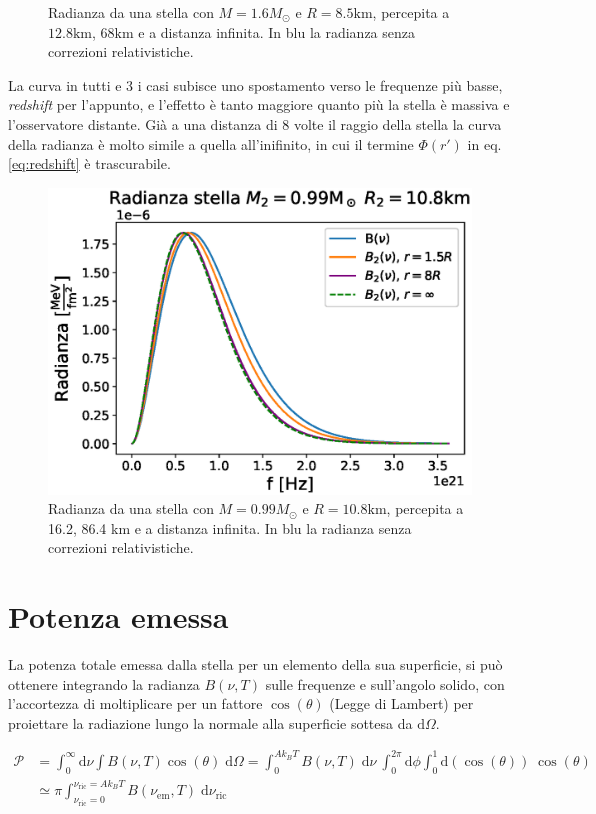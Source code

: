 \documentclass[a4paper, titlepage]{article}
\begin{document}
\begin{figure}[h]
\begin{minipage}{0.49\textwidth}
        \caption{Radianza da una stella con $M = 1.6M_\odot$ e
        $R = 8.5\unit{\kilo\meter}$, percepita a $12.8 \unit{\kilo\meter}$,
        $68 \unit{\kilo\meter}$ e a distanza infinita.
        In blu la radianza senza correzioni relativistiche.\\}
        \label{fig:rad2}
    \end{minipage}
\end{figure}

La curva in tutti e 3 i casi subisce uno spostamento verso le frequenze più
basse, \textit{redshift} per l'appunto, e l'effetto è tanto maggiore quanto più
la stella è massiva e l'osservatore distante. Già a una distanza di 8 volte il
raggio della stella la curva della radianza è molto simile a quella
all'inifinito, in cui il termine $\Phi (r')$ in eq. \ref{eq:redshift} è
trascurabile.
\begin{figure}[h]
    \centering
    \includegraphics[width = 0.6 \textwidth]{Figures/radianza2.eps}
    \caption{Radianza da una stella con $M = 0.99M_\odot$ e
    $R = 10.8\unit{\kilo\meter}$, percepita a 16.2, 86.4 \unit{\kilo\meter} e a
    distanza infinita.
    In blu la radianza senza correzioni relativistiche.}
    \label{fig:rad3}
\end{figure}

\newpage


\section{Potenza emessa}
La potenza totale emessa dalla stella per un elemento della sua superficie, si
può ottenere integrando la radianza $B(\nu, T)$ sulle frequenze e sull'angolo
solido, con l'accortezza di moltiplicare per un fattore $\cos(\theta)$ (Legge
di Lambert) per proiettare la radiazione lungo la normale alla superficie
sottesa da $\mathrm{d}\Omega$.

\begin{align}
    \mathcal P &= \int_0^\infty \mathrm{d}\nu \int B(\nu, T) \cos(\theta) \;
    \mathrm{d}\Omega
    =  \int_0^{A k_B T} B(\nu, T) \; \mathrm{d}\nu ~ 
    \int_0^{2 \pi} \mathrm{d}\phi \int_0^1 \mathrm{d}(\cos(\theta)) \;
    \cos(\theta) \\
    &\simeq \pi \int_{\nu_\text{ric} = 0}^{\nu_\text{ric}
    = A k_B T} B(\nu_\text{em}, T) \; \mathrm{d}\nu_\text{ric}
    \label{eq:Pot}
\end{align}
\end{document}
